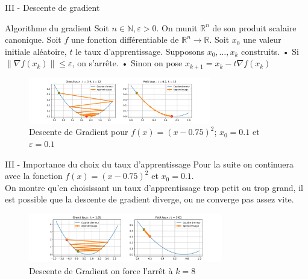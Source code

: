 \documentclass[10pt]{beamer}
\newcommand{\norme}[1]{\| #1 \|}
\begin{document}
\begin{frame}{III - Descente de gradient}
\begin{block}{Algorithme du gradient}
Soit $n \in \mathbb{N}, \varepsilon > 0$. On munit $\mathbb{R}^n$ de son produit scalaire canonique. \newline
    Soit $f$ une fonction différentiable de $\mathbb{R}^n \to \mathbb{R}$. \newline
    Soit $x_0$ une valeur initiale aléatoire, $t$ le taux d'apprentissage. \newline
    Supposons $x_0, \ldots, x_k$ construits. \newline
    • Si $\norme{\nabla f(x_k)} \leq \varepsilon$, on s'arrête. \newline
    • Sinon on pose $x_{k+1} = x_k - t \nabla f(x_k)$ \newline
\end{block}

\begin{figure}
	\centering
    \includegraphics[height=75px]{1-DescenteGradient.jpg}
	\caption{Descente de Gradient pour $f(x) = (x-0.75)^2$; $x_0=0.1$ et $\varepsilon = 0.1$}
\end{figure}
\end{frame}

\begin{frame}{III - Importance du choix du taux d'apprentissage}
Pour la suite on continuera avec la fonction $f(x) = (x-0.75)^2$ et $x_0=0.1$. \\
On montre qu'en choisissant un taux d'apprentissage trop petit ou trop grand, il est possible que la descente de gradient diverge, ou ne converge pas assez vite.
\begin{figure}
	\centering
    \includegraphics[height=80px]{2-DescenteGradient.jpg}
	\caption{Descente de Gradient on force l'arrêt à $k=8$}
\end{figure}
\end{frame}
\end{document}
